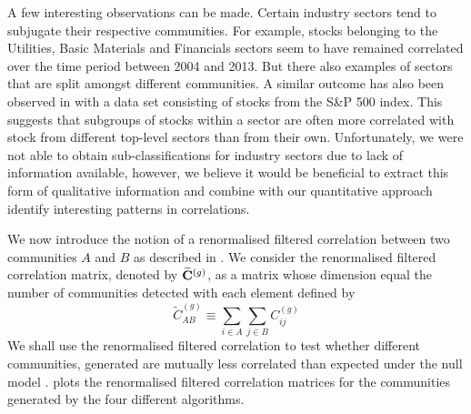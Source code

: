 A few interesting observations can be made.
Certain industry sectors tend to subjugate their respective communities.
For example, stocks belonging to the Utilities, Basic Materials and Financials sectors seem to have remained correlated over the time period between 2004 and 2013.
But there also examples of sectors that are split amongst different communities.
A similar outcome has also been observed in \cite{MG13} with a data set consisting of stocks from the S\&P 500 index.
This suggests that subgroups of stocks within a sector are often more correlated with stock from different top-level sectors than from their own.
Unfortunately, we were not able to obtain sub-classifications for industry sectors due to lack of information available, however, we believe it would be beneficial to extract this form of qualitative information and combine with our quantitative approach identify interesting patterns in correlations.

We now introduce the notion of a renormalised filtered correlation between two communities $A$ and $B$ as described in \cite{MG13}.
We consider the renormalised filtered correlation matrix, denoted by $\widetilde{\mathbf C}^{(g)}$, as a matrix whose dimension equal the number of communities detected with each element defined by
\begin{equation}
\label{eq:renormalisedFilteredCorrelationMatrix}
	\widetilde{C}^{(g)}_{AB} \equiv \sum_{i \in A} \sum_{j \in B} C^{(g)}_{ij}
\end{equation}
We shall use the renormalised filtered correlation to test whether different communities, generated are mutually less correlated than expected under the null model \cite{MG13}.
 plots the renormalised filtered correlation matrices for the communities generated by the four different algorithms.


